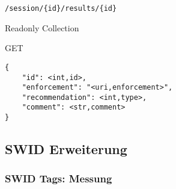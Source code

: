 \documentclass[10pt,a4paper]{scrartcl}
\begin{document}
\begin{mdframed}[style=def]
\begin{description*}
	\item[URI Path] \texttt{/session/\{id\}/results/\{id\}}
	\item[Archetype] Readonly Collection
	\item[Filter Query] \hfill
	\item[Methods] GET
	\item[JSON Format Response] \hfill
\begin{lstlisting}
{
    "id": <int,id>,
    "enforcement": "<uri,enforcement>",
    "recommendation": <int,type>, 	
    "comment": <str,comment>
}
\end{lstlisting}
    \item[Beschreibung] 
\end{description*}
\end{mdframed}


\pagebreak
\subsection{SWID Erweiterung}

\subsubsection{SWID Tags: Messung}
\end{document}

